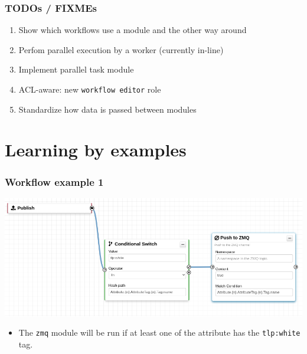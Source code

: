 \begin{frame}
    \frametitle{TODOs / FIXMEs}
    \begin{enumerate}
        \item Show which workflows use a module and the other way around
        \item Perfom parallel execution by a worker (currently in-line)
        \item Implement parallel task module
        \item ACL-aware: new \texttt{workflow editor} role
        \item Standardize how data is passed between modules
    \end{enumerate}
\end{frame}

\section{Learning by examples}
\begin{frame}
    \frametitle{Workflow example 1}
    \begin{center}
        \includegraphics[width=0.95\linewidth]{pictures/example-1.png}
    \end{center}

    \begin{itemize}
        \item The \texttt{zmq} module will be run if at least one of the attribute has the \texttt{tlp:white} tag.
    \end{itemize}
\end{frame}

